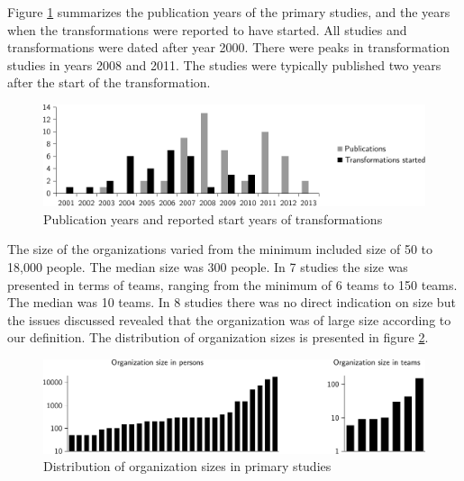 Figure \ref{fig:transformation_time} summarizes the publication years of the
primary studies, and the years when the transformations were reported to have
started. All studies and transformations were dated after year 2000. There were
peaks in transformation studies in years 2008 and 2011. The studies were
typically published two years after the start of the transformation.

\begin{figure}[b]
  \begin{center}
    \includegraphics[width=1\textwidth]{graphics/transformation_time.pdf}
    \caption{Publication years and reported start years of transformations}
    \label{fig:transformation_time}
  \end{center}
\end{figure}

The size of the organizations varied from the minimum included size of 50 to
18,000 people. The median size was 300 people. In 7 studies the size was
presented in terms of teams, ranging from the minimum of 6 teams to 150 teams.
The median was 10 teams. In 8 studies there was no direct indication on size
but the issues discussed revealed that the organization was of large size
according to our definition. The distribution of organization sizes is presented
in figure \ref{fig:organization_size}.

\begin{figure}[!t]
  \begin{center}
    \includegraphics[width=1\textwidth]{graphics/organization_size.pdf}
    \caption{Distribution of organization sizes in primary studies}
    \label{fig:organization_size}
  \end{center}
\end{figure}

